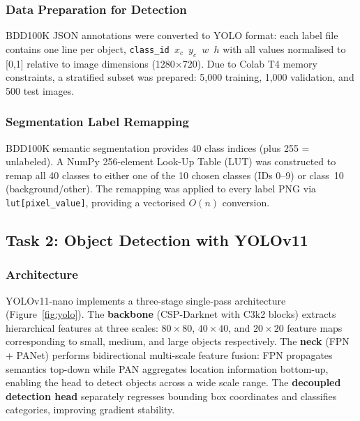 \documentclass[10pt,twocolumn]{article}
\begin{document}
\subsubsection{Data Preparation for Detection}

BDD100K JSON annotations were converted to YOLO format:
each label file contains one line per object,
\texttt{class\_id $x_c$ $y_c$ $w$ $h$} with all values normalised to [0,1]
relative to image dimensions (1280$\times$720).
Due to Colab T4 memory constraints, a stratified subset was prepared:
5{,}000 training, 1{,}000 validation, and 500 test images.

\subsubsection{Segmentation Label Remapping}

BDD100K semantic segmentation provides 40 class indices (plus 255 = unlabeled).
A NumPy 256-element Look-Up Table (LUT) was constructed to remap all 40 classes
to either one of the 10 chosen classes (IDs 0--9) or class~10 (background/other).
The remapping was applied to every label PNG via \texttt{lut[pixel\_value]},
providing a vectorised $O(n)$ conversion.

\subsection{Task 2: Object Detection with YOLOv11}

\subsubsection{Architecture}
\label{sec:yolo_arch}

YOLOv11-nano implements a three-stage single-pass architecture (Figure~\ref{fig:yolo}).
The \textbf{backbone} (CSP-Darknet with C3k2 blocks) extracts hierarchical features
at three scales: $80\times80$, $40\times40$, and $20\times20$ feature maps
corresponding to small, medium, and large objects respectively.
The \textbf{neck} (FPN + PANet) performs bidirectional multi-scale feature fusion:
FPN propagates semantics top-down while PAN aggregates location information
bottom-up, enabling the head to detect objects across a wide scale range.
The \textbf{decoupled detection head} separately regresses bounding box
coordinates and classifies categories, improving gradient stability.
\end{document}
